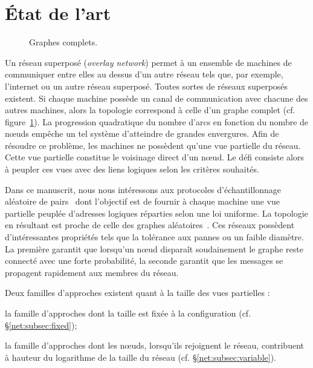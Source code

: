 

\section{État de l'art}
\label{net:sec:stateoftheart}

\begin{figure}
  \begin{center}
    
    \caption[Graphes complets]{\label{net:fig:completegraph}Graphes complets.}
  \end{center}
\end{figure}

Un réseau superposé (\emph{overlay network}) permet à un ensemble de machines de
communiquer entre elles au dessus d'un autre réseau tels que, par exemple,
l'internet ou un autre réseau superposé.  Toutes sortes de réseaux superposés
existent. Si chaque machine possède un canal de communication avec chacune des
autres machines, alors la topologie correspond à celle d'un graphe complet
(cf. figure~\ref{net:fig:completegraph}). La progression quadratique du nombre
d'arcs en fonction du nombre de nœuds empêche un tel système d'atteindre de
grandes envergures. Afin de résoudre ce problème, les machines ne possèdent
qu'une vue partielle du réseau. Cette vue partielle constitue le voisinage
direct d'un nœud. Le défi consiste alors à peupler ces vues avec des liens
logiques selon les critères souhaités.


Dans ce manuscrit, nous nous intéressons aux protocoles d'échantillonnage
aléatoire de pairs~\cite{jelasity2007gossip} dont l'objectif est de fournir à
chaque machine une vue partielle peuplée d'adresses logiques réparties selon une
loi uniforme. La topologie en résultant est proche de celle des graphes
aléatoires~\cite{erdos1959random}. Ces réseaux possèdent d'intéressantes
propriétés tels que la tolérance aux pannes ou un faible diamètre. La première
garantit que lorsqu'un nœud disparaît soudainement le graphe reste connecté avec
une forte probabilité, la seconde garantit que les messages se propagent
rapidement aux membres du réseau.


\noindent Deux familles d'approches existent quant à la taille des vues partielles :
\begin{inparaenum}[(i)]
\item la famille d'approches dont la taille est fixée à la configuration
  (cf. §\ref{net:subsec:fixed});
\item la famille d'approches dont les nœuds, lorsqu'ils rejoignent le réseau,
  contribuent à hauteur du logarithme de la taille du réseau
  (cf. §\ref{net:subsec:variable}).
\end{inparaenum}

